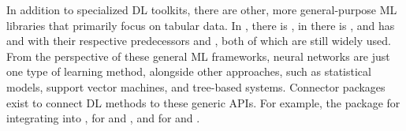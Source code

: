 \documentclass[article]{jss}
\theoremstyle{definition}
\begin{document}
In addition to specialized DL toolkits, there are other, more general-purpose ML libraries that primarily focus on tabular data.
In \python, there is \sklearn{} \citep{ref-pedregosa2011scikit-learn}, in \julia{} there is \mlj{} \citep{ref-blaom2020mlj}, and \rlang{} has \tidymodels{} \citep{ref-kuhn2020tidymodels} and  \citep{ref-mlr32019} with their respective predecessors  \citep{ref-kuhn2021caret} and  \citep{ref-bischl2016mlr}, both of which are still widely used.
From the perspective of these general ML frameworks, neural networks are just one type of learning method, alongside other approaches, such as statistical models, support vector machines, and tree-based systems.
Connector packages exist to connect DL methods to these generic APIs.
For example, the  package \citep{ref-skorch} for integrating \pytorch{} into \sklearn{},  \citep{ref-MLJFlux} for \flux{} and \mlj{}, and  \citep{ref-brulee2025} for \torch{} and \tidymodels{}.
\end{document}
